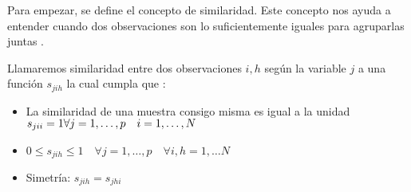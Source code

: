 \noindent Para empezar, se define el concepto de similaridad. Este concepto nos ayuda a entender cuando dos observaciones son lo suficientemente iguales para agruparlas juntas \cite{Mardia 1979, Peña 2002}. 

\begin{defi}
Llamaremos similaridad entre dos observaciones  $i,h$ según la variable $j$ a una función $s_{jih}$ la cual cumpla que :
\begin{itemize}
\item La similaridad de una muestra consigo misma es igual a la unidad $s_{jii}=1 \\ \forall j=1,\ldots,p \quad i=1,\ldots, N$
\item $0\leq s_{jih} \leq 1\quad \forall j=1,\ldots,p \quad \forall i,h=1,\ldots N  $
\item Simetría: $s_{jih}=s_{jhi}$
\end{itemize}
\end{defi}
